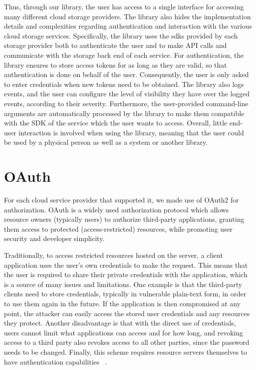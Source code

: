 Thus, through our library, the user has access to a single interface for accessing many different cloud storage providers. The library also hides the implementation details and complexities regarding authentication and interaction with the various cloud storage services. Specifically, the library uses the \ac{sdk}s provided by each storage provider both to authenticate the user and to make API calls and communicate with the storage back end of each service. For authentication, the library ensures to store access tokens for as long as they are valid, so that authentication is done on behalf of the user. Consequently, the user is only asked to enter credentials when new tokens need to be obtained. The library also logs events, and the user can configure the level of visibility they have over the logged events, according to their severity. Furthermore, the user-provided command-line arguments are automatically processed by the library to make them compatible with the SDK of the service which the user wants to access. Overall, little end-user interaction is involved when using the library, meaning that the user could be used by a physical person as well as a system or another library.


\section{OAuth}
For each cloud service provider that supported it, we made use of OAuth2 for authorization. OAuth is a widely used authorization protocol which allows resource owners (typically users) to authorize third-party applications, granting them access to protected (access-restricted) resources, while promoting user security and developer simplicity.  

Traditionally, to access restricted resources hosted on the server, a client application uses the user's own credentials  to make the request. This means that the user is required to share their private credentials with the application, which is a source of many issues and limitations. One example is that the third-party clients need to store credentials, typically in vulnerable plain-text form,  in order to use them again in the future. If the application is then compromised at any point, the attacker can easily access the stored user credentials and any resources they protect. Another disadvantage is that with the direct use of credentials, users cannot limit what applications can access and for how long, and revoking access to a third party also revokes access to all other parties, since the password needs to be changed. Finally, this scheme requires resource servers themselves to have authentication capabilities ~\cite{oauth}.

